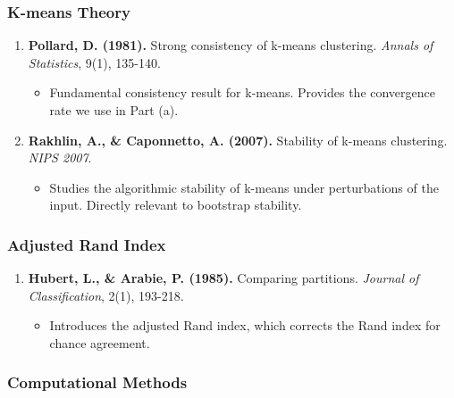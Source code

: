 \documentclass[
  12pt,
]{article}
\providecommand{\tightlist}{%
  \setlength{\itemsep}{0pt}\setlength{\parskip}{0pt}}
\begin{document}
\subsubsection{K-means Theory}\label{k-means-theory}

\begin{enumerate}
\def\labelenumi{\arabic{enumi}.}
\setcounter{enumi}{4}
\tightlist
\item
  \textbf{Pollard, D. (1981).} Strong consistency of k-means clustering.
  \emph{Annals of Statistics}, 9(1), 135-140.

  \begin{itemize}
  \tightlist
  \item
    Fundamental consistency result for k-means. Provides the convergence
    rate we use in Part (a).
  \end{itemize}
\item
  \textbf{Rakhlin, A., \& Caponnetto, A. (2007).} Stability of k-means
  clustering. \emph{NIPS 2007}.

  \begin{itemize}
  \tightlist
  \item
    Studies the algorithmic stability of k-means under perturbations of
    the input. Directly relevant to bootstrap stability.
  \end{itemize}
\end{enumerate}

\subsubsection{Adjusted Rand Index}\label{adjusted-rand-index}

\begin{enumerate}
\def\labelenumi{\arabic{enumi}.}
\setcounter{enumi}{6}
\tightlist
\item
  \textbf{Hubert, L., \& Arabie, P. (1985).} Comparing partitions.
  \emph{Journal of Classification}, 2(1), 193-218.

  \begin{itemize}
  \tightlist
  \item
    Introduces the adjusted Rand index, which corrects the Rand index
    for chance agreement.
  \end{itemize}
\end{enumerate}

\subsubsection{Computational Methods}\label{computational-methods}
\end{document}
